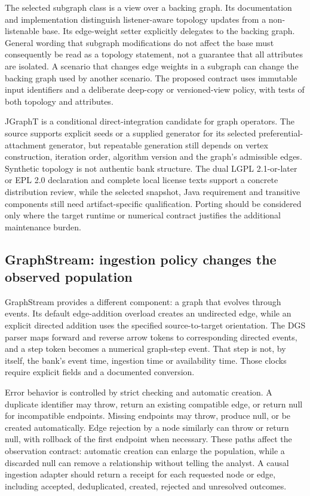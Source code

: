 The selected subgraph class is a view over a backing graph. Its documentation and implementation distinguish listener-aware topology updates from a non-listenable base. Its edge-weight setter explicitly delegates to the backing graph. General wording that subgraph modifications do not affect the base must consequently be read as a topology statement, not a guarantee that all attributes are isolated. A scenario that changes edge weights in a subgraph can change the backing graph used by another scenario. The proposed contract uses immutable input identifiers and a deliberate deep-copy or versioned-view policy, with tests of both topology and attributes.\citep{exec25_jnet_jgrapht}

JGraphT is a conditional direct-integration candidate for graph operators. The source supports explicit seeds or a supplied generator for its selected preferential-attachment generator, but repeatable generation still depends on vertex construction, iteration order, algorithm version and the graph's admissible edges. Synthetic topology is not authentic bank structure. The dual LGPL 2.1-or-later or EPL 2.0 declaration and complete local license texts support a concrete distribution review, while the selected snapshot, Java requirement and transitive components still need artifact-specific qualification. Porting should be considered only where the target runtime or numerical contract justifies the additional maintenance burden.\citep{exec25_jnet_jgrapht,exec25_jnet_choice}

\subsection{GraphStream: ingestion policy changes the observed population}

GraphStream provides a different component: a graph that evolves through events. Its default edge-addition overload creates an undirected edge, while an explicit directed addition uses the specified source-to-target orientation. The DGS parser maps forward and reverse arrow tokens to corresponding directed events, and a step token becomes a numerical graph-step event. That step is not, by itself, the bank's event time, ingestion time or availability time. Those clocks require explicit fields and a documented conversion.\citep{exec25_jnet_graphstream}

Error behavior is controlled by strict checking and automatic creation. A duplicate identifier may throw, return an existing compatible edge, or return null for incompatible endpoints. Missing endpoints may throw, produce null, or be created automatically. Edge rejection by a node similarly can throw or return null, with rollback of the first endpoint when necessary. These paths affect the observation contract: automatic creation can enlarge the population, while a discarded null can remove a relationship without telling the analyst. A causal ingestion adapter should return a receipt for each requested node or edge, including accepted, deduplicated, created, rejected and unresolved outcomes.\citep{exec25_jnet_graphstream}


